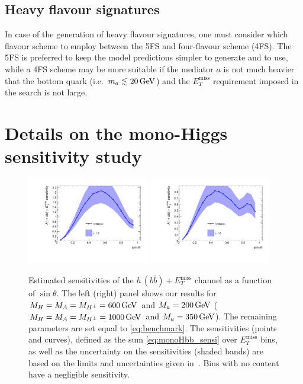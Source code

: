 \documentclass[a4paper, 11pt,notoc]{article}
\newcommand{\MET}{\ensuremath{E_T^\mathrm{miss}}\xspace}
\newcommand{\met}{\MET}
\newcommand{\mA}{\ensuremath{M_{A}}\xspace}
\newcommand{\ma}{\ensuremath{M_{a}}\xspace}
\newcommand{\mH}{\ensuremath{M_{H}}\xspace}
\newcommand{\mHc}{\ensuremath{M_{H^{\pm}}}\xspace}
\begin{document}
\subsection{Heavy flavour signatures}

In case of the generation of heavy flavour signatures, one must consider which flavour scheme to employ between the 5FS and four-flavour scheme (4FS). The 5FS is preferred to keep the model predictions simpler to generate and to use, while a 4FS scheme may be more suitable if the mediator $a$ is not much heavier that the bottom quark (i.e.~$m_a \lesssim 20 \, {\rm GeV}$) and the $\MET$ requirement imposed in the search is not large. 


\section{Details on the mono-Higgs sensitivity study}
\label{app:extramonoh}

\begin{figure}[t!]
\centering
\includegraphics[width=0.475\textwidth]{monoHbb_sinp_scan_1_sensi_1D.pdf} \quad 
\includegraphics[width=0.475\textwidth]{monoHbb_sinp_scan_2_sensi_1D.pdf}
\vspace{4mm}
\caption{Estimated sensitivities of  the $h \, (b \bar b)+\MET$ channel as a function of $\sin \theta$. The left (right) panel shows our results for $\mH = \mA = \mHc = 600 \, {\rm GeV}$ and $\ma = 200 \, {\rm GeV}$ ($\mH = \mA = \mHc = 1000 \, {\rm GeV}$ and $\ma = 350 \, {\rm GeV}$).  The remaining parameters are set equal to \eqref{eq:benchmark}. The sensitivities (points and curves), defined as the sum \eqref{eq:monoHbb_sensi} over \met bins, as well as the uncertainty on the sensitivities (shaded bands)  are based on the limits and uncertainties given in~\cite{Aaboud:2017yqz}. Bins with no content have a negligible sensitivity. }
\label{fig:monoHbb_appendix1}
\end{figure}
\end{document}
